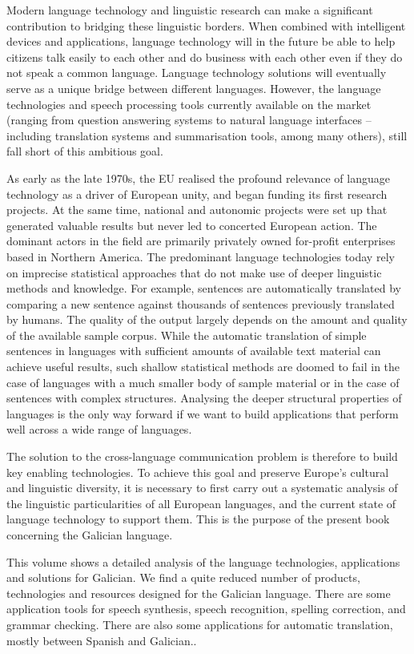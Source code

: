 \begin{multicols}{2}
Modern language technology and linguistic research can make a significant contribution to bridging these linguistic borders. When combined with intelligent devices and applications, language technology will in the future be able to help citizens talk easily to each other and do business with each other even if they do not speak a common language. Language technology solutions will eventually serve as a unique bridge between different languages. However, the language technologies and speech processing tools currently available on the market (ranging from question answering systems to natural language interfaces -- including translation systems and summarisation tools, among many others), still fall short of this ambitious goal. 

As early as the late 1970s, the EU realised the profound relevance of language technology as a driver of European unity, and began funding its first research projects. At the same time, national and autonomic projects were set up that generated valuable results but never led to concerted European action. The dominant actors in the field are primarily privately owned for-profit enterprises based in Northern America. The predominant language technologies today rely on imprecise statistical approaches that do not make use of deeper linguistic methods and knowledge. For example, sentences are automatically translated by comparing a new sentence against thousands of sentences previously translated by humans. The quality of the output largely depends on the amount and quality of the available sample corpus. While the automatic translation of simple sentences in languages with sufficient amounts of available text material can achieve useful results, such shallow statistical methods are doomed to fail in the case of languages with a much smaller body of sample material or in the case of sentences with complex structures. Analysing the deeper structural properties of languages is the only way forward if we want to build applications that perform well across a wide range of languages. 

The solution to the cross-language communication problem is therefore to build key enabling technologies. To achieve this goal and preserve Europe’s cultural and linguistic diversity, it is necessary to first carry out a systematic analysis of the linguistic particularities of all European languages, and the current state of language technology to support them.  This is the purpose of the present book concerning the Galician language. 

This volume shows a detailed analysis of the language technologies, applications and solutions for Galician. We find a quite reduced number of products, technologies and resources designed for the Galician language. There are some application tools for speech synthesis, speech recognition, spelling correction, and grammar checking. There are also some applications for automatic translation, mostly between Spanish and Galician..
 


\end{multicols}
